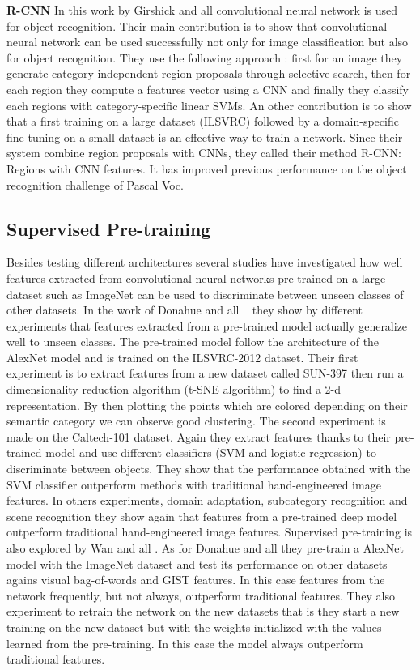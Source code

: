     \bigskip
    \textbf{R-CNN}
    In this work by Girshick and all \cite{girshick2014rich} convolutional neural network is used for object recognition. Their main contribution is to show that convolutional neural network can be used successfully not only for image classification but also for object recognition. They use the following approach : first for an image they generate category-independent region proposals through selective search, then for each region they compute a features vector using a CNN and finally they classify each regions with category-specific linear SVMs. An other contribution is to show that a first training on a large dataset (ILSVRC) followed by a domain-specific fine-tuning on a small dataset is an effective way to train a network. Since their system combine region proposals with CNNs, they called their method R-CNN: Regions with CNN features. It has improved previous performance on the object recognition challenge of Pascal Voc.

  \subsection{Supervised Pre-training}

  Besides testing different architectures several studies have investigated how well features extracted from convolutional neural networks pre-trained on a large dataset such as ImageNet can be used to discriminate between unseen classes of other datasets. In the work of Donahue and all \cite{donahue2013decaf}  they show by different experiments that features extracted from a pre-trained model actually generalize well to unseen classes. The pre-trained model follow the architecture of the AlexNet model \cite{krizhevsky2012imagenet} and is trained on the ILSVRC-2012 dataset. Their first experiment is to extract features from a new dataset called SUN-397 then run a dimensionality reduction algorithm (t-SNE algorithm) to find a 2-d representation. By then plotting the points which are colored depending on their semantic category we can observe good clustering. The second experiment is made on the Caltech-101 dataset. Again they extract features thanks to their pre-trained model and use different classifiers (SVM and logistic regression) to discriminate between objects. They show that the performance obtained with the SVM classifier outperform methods with traditional hand-engineered image features. In others experiments, domain adaptation, subcategory recognition and scene recognition they show again that features from a pre-trained deep model outperform traditional hand-engineered image features. Supervised pre-training is also explored by Wan and all \cite{wan2014deep}. As for Donahue and all they pre-train a AlexNet model with the ImageNet dataset and test its performance on other datasets agains visual bag-of-words and GIST features. In this case features from the network frequently, but not always, outperform traditional features. They also experiment to retrain the network on the new datasets that is they start a new training on the new dataset but with the weights initialized with the values learned from the pre-training. In this case the model always outperform traditional features.
